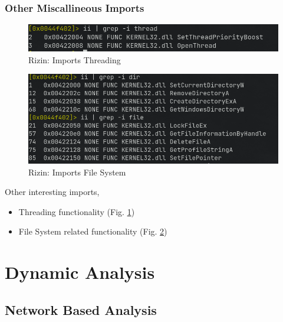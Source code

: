 \documentclass[10pt,a4paper]{article}
\begin{document}
	\subsubsection{Other Miscallineous Imports}
		\begin{figure}[!htbp]%
			\centering
			\includegraphics[width=\columnwidth]{pics/impThr.png}
			\caption{Rizin: Imports Threading}
			\label{impThr}
		\end{figure}
		\begin{figure}[!htbp]%
			\centering
			\includegraphics[width=\columnwidth]{pics/impFile.png}
			\caption{Rizin: Imports File System}
			\label{impFile}
		\end{figure}
		Other interesting imports,
		\begin{itemize}
			\item Threading functionality (Fig. \ref{impThr})
			\item File System related functionality (Fig. \ref{impFile})
		\end{itemize}

\section{Dynamic Analysis}
		\subsection{Network Based Analysis}
\end{document}

